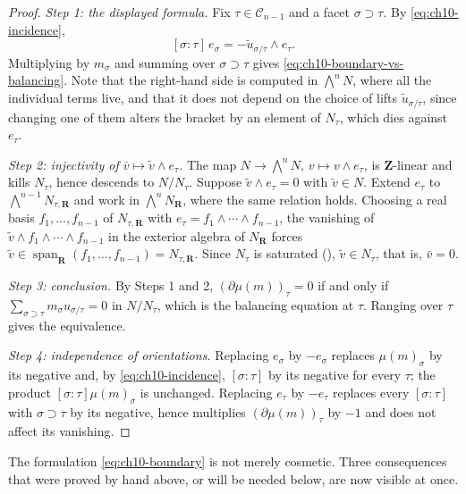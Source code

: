 \begin{proof}
\emph{Step 1: the displayed formula.}
Fix $\tau\in\mathscr C_{n-1}$ and a facet $\sigma\supset\tau$.  By
\eqref{eq:ch10-incidence},
\[
 [\sigma:\tau]\,e_\sigma
 =-\widetilde u_{\sigma/\tau}\wedge e_\tau .
\]
Multiplying by $m_\sigma$ and summing over $\sigma\supset\tau$ gives
\eqref{eq:ch10-boundary-vs-balancing}.  Note that the right-hand side is
computed in $\bigwedge^nN$, where all the individual terms live, and that it
does not depend on the choice of lifts $\widetilde u_{\sigma/\tau}$, since
changing one of them alters the bracket by an element of $N_\tau$, which
dies against $e_\tau$.

\emph{Step 2: injectivity of $\bar v\mapsto\widetilde v\wedge e_\tau$.}
The map $N\to\bigwedge^nN$, $v\mapsto v\wedge e_\tau$, is $\mathbf Z$-linear
and kills $N_\tau$, hence descends to $N/N_\tau$.  Suppose
$\widetilde v\wedge e_\tau=0$ with $\widetilde v\in N$.  Extend $e_\tau$ to
$\bigwedge^{n-1}N_{\tau,\mathbf R}$ and work in $\bigwedge^nN_{\mathbf R}$,
where the same relation holds.  Choosing a real basis $f_1,\ldots,f_{n-1}$ of
$N_{\tau,\mathbf R}$ with $e_\tau=f_1\wedge\cdots\wedge f_{n-1}$, the
vanishing of $\widetilde v\wedge f_1\wedge\cdots\wedge f_{n-1}$ in the
exterior algebra of $N_{\mathbf R}$ forces
$\widetilde v\in\operatorname{span}_{\mathbf R}(f_1,\ldots,f_{n-1})
=N_{\tau,\mathbf R}$.  Since $N_\tau$ is saturated
(), $\widetilde v\in N_\tau$, that is,
$\bar v=0$.

\emph{Step 3: conclusion.}
By Steps 1 and 2, $(\partial\mu(m))_\tau=0$ if and only if
$\sum_{\sigma\supset\tau}m_\sigma u_{\sigma/\tau}=0$ in $N/N_\tau$, which is
the balancing equation at $\tau$.  Ranging over $\tau$ gives the
equivalence.

\emph{Step 4: independence of orientations.}
Replacing $e_\sigma$ by $-e_\sigma$ replaces $\mu(m)_\sigma$ by its negative
and, by \eqref{eq:ch10-incidence}, $[\sigma:\tau]$ by its negative for every
$\tau$; the product $[\sigma:\tau]\mu(m)_\sigma$ is unchanged.  Replacing
$e_\tau$ by $-e_\tau$ replaces every $[\sigma:\tau]$ with $\sigma\supset\tau$
by its negative, hence multiplies $(\partial\mu(m))_\tau$ by $-1$ and does
not affect its vanishing.
\end{proof}

The formulation \eqref{eq:ch10-boundary} is not merely cosmetic.  Three
consequences that were proved by hand above, or will be needed below, are
now visible at once.

